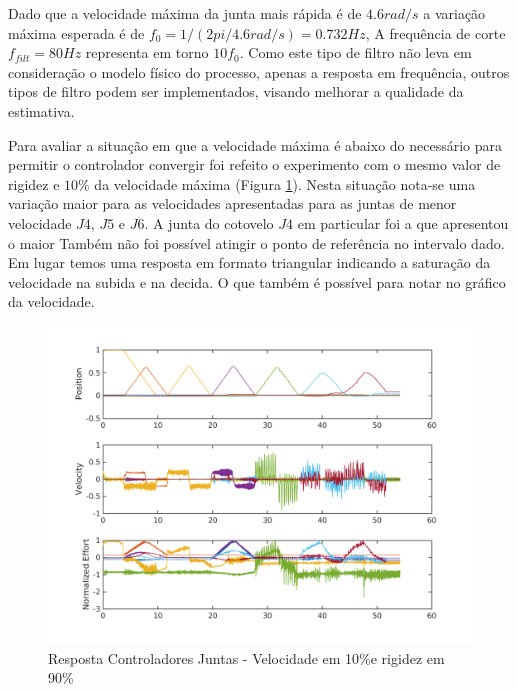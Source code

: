 
Dado que a velocidade máxima da junta mais rápida é de $4.6 rad/s$ a variação máxima esperada é de $f_0 = 1/(2pi/4.6 rad/s) = 0.732 Hz$, A frequência de corte $f_{filt} = 80Hz$ representa em torno $10 f_0$. Como este tipo de filtro não leva em consideração o modelo físico do processo, apenas a resposta em frequência, outros tipos de filtro podem ser implementados, visando melhorar a qualidade da estimativa.

Para avaliar a situação em que a velocidade máxima é abaixo do necessário para permitir o controlador convergir foi refeito o experimento com o mesmo valor de rigidez e $10\%$ da velocidade máxima (Figura \ref{fig:jointIdentificationSpeed10p_stiff90p2}). Nesta situação nota-se uma variação maior para as velocidades apresentadas para as juntas de menor velocidade $J4$, $J5$ e $J6$. A junta do cotovelo $J4$ em particular foi a que apresentou o maior  Também não foi possível atingir o ponto de referência no intervalo dado. Em lugar temos uma resposta em formato triangular indicando a saturação da velocidade na subida e na decida. O que também é possível para notar no gráfico da velocidade.

\begin{figure}[H]
    \centering
    \includegraphics[width = \linewidth]{tex/figs/jointIdentificationSpeed10p_stiff90p2.png}
    \caption{Resposta Controladores Juntas - Velocidade em 10\%e rigidez em 90\%}
    \label{fig:jointIdentificationSpeed10p_stiff90p2}
\end{figure}

